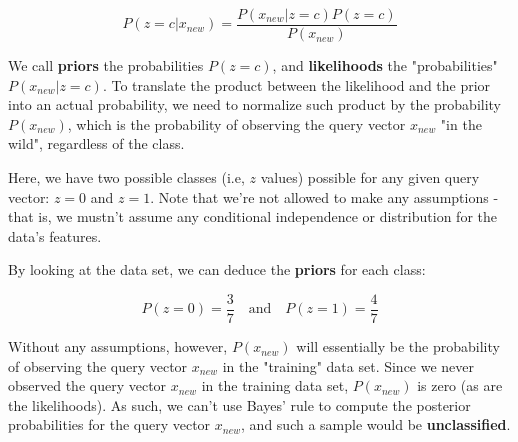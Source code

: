 \documentclass[12pt]{article}
\begin{document}
\begin{enumerate}[leftmargin=\labelsep]
\begin{enumerate}
{                $$
                  P(z = c | x_{new}) = \frac{P(x_{new} | z = c) P(z = c)}{P(x_{new})}
                $$

                We call \textbf{priors} the probabilities $P(z = c)$, and \textbf{likelihoods} the "probabilities" $P(x_{new} | z = c)$.
                To translate the product between the likelihood and the prior into an actual
                probability, we need to normalize such product by the probability $P(x_{new})$,
                which is the probability of observing the query vector $x_{new}$ "in the wild", regardless of the class.

                Here, we have two possible classes (i.e, $z$ values) possible for
                any given query vector: $z = 0$ and $z = 1$. Note that we're not
                allowed to make any assumptions - that is, we mustn't assume any
                conditional independence or distribution for the data's features.

                By looking at the data set, we can deduce the \textbf{priors} for each class:

                $$
                  P(z = 0) = \frac{3}{7} \quad \text{and} \quad P(z = 1) = \frac{4}{7}
                $$

                Without any assumptions, however, $P(x_{new})$ will essentially be the
                probability of observing the query vector $x_{new}$ in the "training" data set.
                Since we never observed the query vector $x_{new}$ in the training data set,
                $P(x_{new})$ is zero (as are the likelihoods). As such, we can't use Bayes' rule to compute the
                posterior probabilities for the query vector $x_{new}$, and such a sample
                would be \textbf{unclassified}.

}
\end{enumerate}
\end{enumerate}
\end{document}
